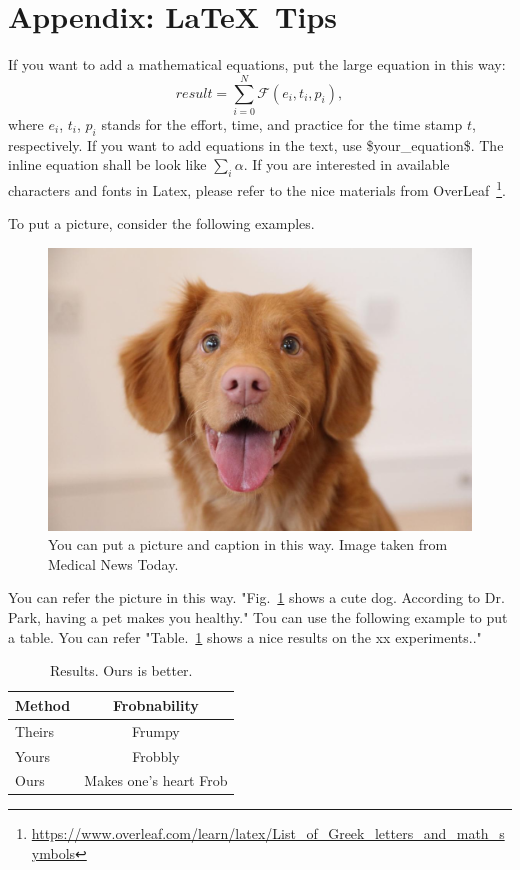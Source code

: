 \section{Appendix: \LaTeX\ Tips}

If you want to add a mathematical equations, put the large equation in this way:
\begin{equation}
result = \sum_{i=0}^N \mathcal{F}(e_i, t_i, p_i),
\end{equation}
where $e_i$, $t_i$, $p_i$ stands for the effort, time, and practice for the time stamp $t$, respectively. If you want to add equations in the text, use \$your\_equation\$. The inline equation shall be look like $\sum_i \alpha$. If you are interested in available characters and fonts in Latex, please refer to the nice materials from OverLeaf~\footnote{\url{https://www.overleaf.com/learn/latex/List_of_Greek_letters_and_math_symbols}}.

To put a picture, consider the following examples.
\begin{figure}
    \includegraphics[width=\linewidth]{dog.jpg}
    \caption{You can put a picture and caption in this way. Image taken from Medical News Today.}
\label{fig:dog}
\end{figure}
You can refer the picture in this way. "Fig.~\ref{fig:dog} shows a cute dog. According to Dr. Park, having a pet makes you healthy."
Tou can use the following example to put a table. You can refer "Table.~\ref{table:example} shows a nice results on the xx experiments.."
\begin{table}
\begin{center}
    \begin{tabular}{|l|c|}
    \hline
    Method & Frobnability \\
    \hline\hline
    Theirs & Frumpy \\
    Yours & Frobbly \\
    Ours & Makes one's heart Frob\\
    \hline
    \end{tabular}
\end{center}
\caption{Results.   Ours is better.}
\label{table:example}
\end{table}

